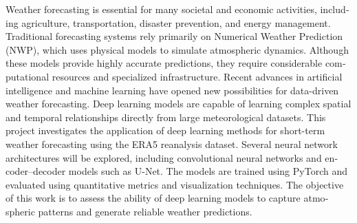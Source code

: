 
\begin{english}
\thispagestyle{empty}
\vspace*{25pt}
\centerline{\bfseries \abstractname}
Weather forecasting is essential for many societal and economic activities, including agriculture, transportation, disaster prevention, and energy management. Traditional forecasting systems rely primarily on Numerical Weather Prediction (NWP), which uses physical models to simulate atmospheric dynamics. Although these models provide highly accurate predictions, they require considerable computational resources and specialized infrastructure.
Recent advances in artificial intelligence and machine learning have opened new possibilities for data-driven weather forecasting. Deep learning models are capable of learning complex spatial and temporal relationships directly from large meteorological datasets.
This project investigates the application of deep learning methods for short-term weather forecasting using the ERA5 reanalysis dataset. Several neural network architectures will be explored, including convolutional neural networks and encoder–decoder models such as U-Net. The models are trained using PyTorch and evaluated using quantitative metrics and visualization techniques.
The objective of this work is to assess the ability of deep learning models to capture atmospheric patterns and generate reliable weather predictions.
\vspace*{25pt}

\end{english}

